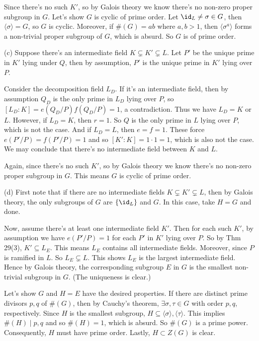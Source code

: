 \documentclass[../Chapter.tex]{subfiles}
\begin{document}
Since there's no such $K'$, so by Galois theory we know there's no non-zero proper subgroup in $G$. Let's show $G$ is cyclic of prime order. Let $\id_L\neq\sigma\in G$, then $\langle\sigma\rangle=G$, so $G$ is cyclic. Moreover, if $\#(G)=ab$ where $a,b>1$, then $\langle\sigma^a\rangle$ forms a non-trivial proper subgroup of $G$, which is absurd. So $G$ is of prime order.

(c) Suppose there's an intermediate field $K\varsubsetneq K'\varsubsetneq L$. Let $P'$ be the unique prime in $K'$ lying under $Q$, then by assumption, $P'$ is the unique prime in $K'$ lying over $P$.

Consider the decomposition field $L_D$. If it's an intermediate field, then by assumption $Q_D$ is the only prime in $L_D$ lying over $P$, so $[L_D:K]=e(Q_D/P)f(Q_D/P)=1$, a contradiction. Thus we have $L_D=K$ or $L$. However, if $L_D=K$, then $r=1$. So $Q$ is the only prime in $L$ lying over $P$, which is not the case. And if $L_D=L$, then $e=f=1$. These force $e(P'/P)=f(P'/P)=1$ and so $[K':K]=1\cdot 1=1$, which is also not the case. We may conclude that there's no intermediate field between $K$ and $L$.

Again, since there's no such $K'$, so by Galois theory we know there's no non-zero proper subgroup in $G$. This means $G$ is cyclic of prime order.

(d) First note that if there are no intermediate fields $K\varsubsetneq K'\varsubsetneq L$, then by Galois theory, the only subgroups of $G$ are $\{\id_L\}$ and $G$. In this case, take $H=G$ and done.

Now, assume there's at least one intermediate field $K'$. Then for each such $K'$, by assumption we have $e(P'/P)=1$ for each $P'$ in $K'$ lying over $P$. So by Thm 29(3), $K'\subseteq L_E$. This means $L_E$ contains all intermediate fields. Moreover, since $P$ is ramified in $L$. So $L_E\varsubsetneq L$. This shows $L_E$ is the largest intermediate field. Hence by Galois theory, the corresponding subgroup $E$ in $G$ is the smallest non-trivial subgroup in $G$. (The uniqueness is clear.)

Let's show $G$ and $H=E$ have the desired properties. If there are distinct prime divisors $p,q$ of $\#(G)$, then by Cauchy's theorem, $\exists \sigma,\tau\in G$ with order $p,q$, respectively. Since $H$ is the smallest subgroup, $H\subseteq \langle\sigma\rangle,\langle\tau\rangle$. This implies $\#(H)\mid p,q$ and so $\#(H)=1$, which is absurd. So $\#(G)$ is a prime power. Consequently, $H$ must have prime order. Lastly, $H\subset Z(G)$ is clear.
\end{document}
